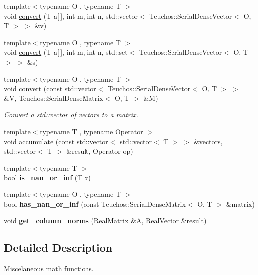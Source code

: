 \begin{DoxyCompactItemize}
\item 
{\footnotesize template$<$typename O , typename T $>$ }\\void \hyperlink{MathTools_8hpp_ac949ae4248474a32c99b3463f24b0b7a}{convert} (T a\mbox{[}$\,$\mbox{]}, int m, int n, std\+::vector$<$ Teuchos\+::\+Serial\+Dense\+Vector$<$ O, T $>$ $>$ \&v)
\item 
{\footnotesize template$<$typename O , typename T $>$ }\\void \hyperlink{MathTools_8hpp_a87a9e0561e70289efe24bf0fbbbddcec}{convert} (T a\mbox{[}$\,$\mbox{]}, int m, int n, std\+::set$<$ Teuchos\+::\+Serial\+Dense\+Vector$<$ O, T $>$ $>$ \&s)
\item 
{\footnotesize template$<$typename O , typename T $>$ }\\void \hyperlink{MathTools_8hpp_a9534dfa37a95edeef7cca8d3e0aa0f5d}{convert} (const std\+::vector$<$ Teuchos\+::\+Serial\+Dense\+Vector$<$ O, T $>$ $>$ \&V, Teuchos\+::\+Serial\+Dense\+Matrix$<$ O, T $>$ \&M)
\begin{DoxyCompactList}\small\item\em Convert a std\+::vector of vectors to a matrix. \end{DoxyCompactList}\item 
{\footnotesize template$<$typename T , typename Operator $>$ }\\void \hyperlink{MathTools_8hpp_ab2eea3aedce948033aa263ee5811afc9}{accumulate} (const std\+::vector$<$ std\+::vector$<$ T $>$ $>$ \&vectors, std\+::vector$<$ T $>$ \&result, Operator op)
\item 
{\footnotesize template$<$typename T $>$ }\\bool {\bfseries is\+\_\+nan\+\_\+or\+\_\+inf} (T x)\label{MathTools_8hpp_a0ae6977f6593806c6588946c94c7a2e0}

\item 
{\footnotesize template$<$typename O , typename T $>$ }\\bool {\bfseries has\+\_\+nan\+\_\+or\+\_\+inf} (const Teuchos\+::\+Serial\+Dense\+Matrix$<$ O, T $>$ \&matrix)\label{MathTools_8hpp_ae6659acbddaf7318a09b9d30a14d836b}

\item 
void {\bfseries get\+\_\+column\+\_\+norms} (Real\+Matrix \&A, Real\+Vector \&result)\label{MathTools_8cpp_a56e4493e43e1fbaba0ae19a4862069af}

\end{DoxyCompactItemize}


\subsection{Detailed Description}
Miscelaneous math functions. 

